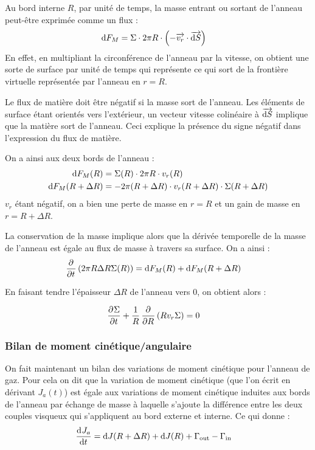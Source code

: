 Au bord interne $R$, par unité de temps, la masse entrant ou sortant de l'anneau peut-être exprimée comme un flux :
\begin{align}
\operatorname{d \!} F_M &= \Sigma \cdot 2\pi R \cdot \left( -{\overrightarrow{v_r}} \cdot {\overrightarrow{\operatorname{d \!}S}} \right)
\end{align}
En effet, en multipliant la circonférence de l'anneau par la vitesse, on obtient une sorte de surface par unité de temps qui représente ce qui sort de la frontière virtuelle représentée par l'anneau en $r=R$. 

Le flux de matière doit être négatif si la masse sort de l'anneau. Les éléments de surface étant orientés vers l'extérieur, un vecteur vitesse colinéaire à ${\overrightarrow{\operatorname{d \!} S}}$ implique que la matière sort de l'anneau. Ceci explique la présence du signe négatif dans l'expression du flux de matière.

On a ainsi aux deux bords de l'anneau :
\begin{subequations}
\begin{align}
\operatorname{d \!} F_M(R) &= \Sigma(R) \cdot 2\pi R \cdot v_r(R)\\
\operatorname{d \!} F_M(R+\Delta R) &= - 2\pi (R+\Delta R) \cdot v_r(R+\Delta R) \cdot \Sigma(R+\Delta R)
\end{align}\label{eq:dif_F_M}
\end{subequations}
$v_r$ étant négatif, on a bien une perte de masse en $r=R$ et un gain de masse en $r=R+\Delta R$.

La conservation de la masse implique alors que la dérivée temporelle de la masse de l'anneau est égale au flux de masse à travers sa surface. On a ainsi : 
\begin{align*}
\mathinner{ \dfrac{\partial{^{}}}{\partial{{t}^{}}} }\left(2\pi R \Delta R \Sigma(R)\right) &= \operatorname{d \!} F_M(R) + \operatorname{d \!} F_M(R+\Delta R)
\end{align*}

En faisant tendre l'épaisseur $\Delta R$ de l'anneau vers 0, on obtient alors :
\begin{important}
\begin{align}
\mathinner{ \dfrac{\partial{^{}}\Sigma}{\partial{{t}^{}}} } + \frac{1}{R}\mathinner{ \dfrac{\partial{^{}}}{\partial{{R}^{}}} }\left(R v_r \Sigma\right)&=0\label{eq:conservation_masse}
\end{align}
\end{important}

\subsubsection{Bilan de moment cinétique/angulaire}
On fait maintenant un bilan des variations de moment cinétique pour l'anneau de gaz. Pour cela on dit que la variation de moment
cinétique (que l'on écrit en dérivant $J_a(t)$) est égale aux variations de moment cinétique induites aux bords de l'anneau par
échange de masse à laquelle s'ajoute la différence entre les deux couples visqueux qui s'appliquent au bord externe et interne.
Ce qui donne : 
\begin{align}
\mathinner{ \dfrac{\operatorname{d \!}{^{}}J_a}{\operatorname{d \!}{{t}^{}}} } &= \operatorname{d \!} J(R+\Delta R) + \operatorname{d \!} J(R) + \Gamma_\text{out} - \Gamma_\text{in}\label{eq:cons_J_a}
\end{align}

